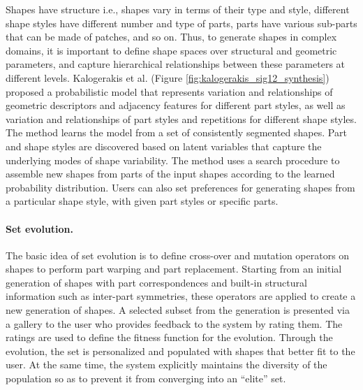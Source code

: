 Shapes have structure i.e., shapes vary in terms of their type and style, different shape styles have different number and type of parts, parts have various sub-parts that can be made of patches, and so on. Thus, to generate shapes in complex domains, it is important to define shape spaces over structural and geometric parameters, and capture hierarchical relationships between these parameters at different levels. Kalogerakis et al. \cite{Kalogerakis:2012:PMC} (Figure \ref{fig:kalogerakis_sig12_synthesis}) proposed a probabilistic model that represents variation and relationships of geometric descriptors and adjacency features for different part styles, as well as variation and relationships of part styles and repetitions for different shape styles. The method learns the model from a set of consistently segmented shapes. Part and shape styles are discovered based on latent variables that capture the underlying modes of shape variability. The method uses a search procedure to assemble new shapes from parts of the input shapes according to the learned probability distribution. Users can also set preferences for generating shapes from a particular shape style, with given part styles or specific parts. 

\paragraph*{Set evolution.}  The basic idea of set evolution is to define cross-over and mutation operators on shapes to perform part warping and part replacement. Starting from an initial generation of shapes with part correspondences and built-in structural information such as inter-part symmetries, these operators are applied to create a new generation of shapes. A selected subset from the generation is presented via a gallery to the user who provides feedback to the system by rating them. The ratings are used to define the fitness function for the evolution. Through the evolution, the set is personalized and populated with shapes that better fit to the user. At the same time, the system explicitly maintains the diversity of the population so as to prevent it from converging into an ``elite'' set.

